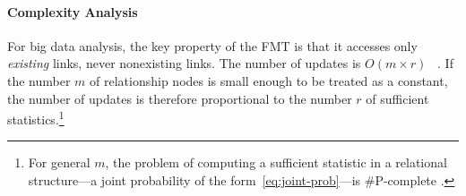 \documentclass{article}
\begin{document}
 \paragraph{Complexity Analysis} For big data analysis, the key property of the FMT is that it accesses only {\em existing} links, never nonexisting links. The number of updates is $O(m \times r)$ ~\cite{Kennes1990}. If the number $m$ of relationship nodes is small enough to be treated as a constant,  the number of updates is therefore proportional to the number $r$ of sufficient statistics.\footnote{For general $m$, the problem of computing a sufficient statistic in a relational structure---a joint probability of the form~\eqref{eq:joint-prob}---is \#P-complete \cite[Prop.12.4]{Domingos2007}.} 
%
\end{document}
